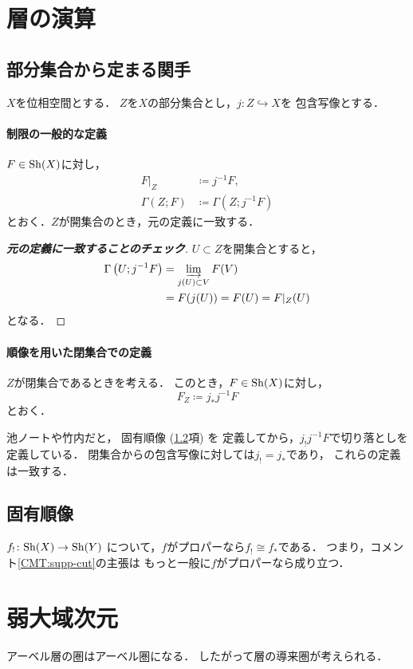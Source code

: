 \section{層の演算}
\subsection{部分集合から定まる関手}
\(X\)を位相空間とする．
\(Z\)を\(X\)の部分集合とし，\(j\colon Z\hookrightarrow X\)を
包含写像とする．
\paragraph{制限の一般的な定義}
\(F\in\Sh(X)\)に対し，
\begin{align}
    F\rvert_Z&\coloneqq j^{-1}F,\\
    \Gamma(Z;F)&\coloneqq\Gamma\left(Z;j^{-1}F\right)    
\end{align}
とおく．\(Z\)が開集合のとき，元の定義に一致する．
\begin{proof}[\textbf{元の定義に一致することのチェック}]
    \(U\subset Z\)を開集合とすると，
    \begin{align*}
        \Gamma\left(U;j^{-1}F\right)
        &=\indlim[j(U)\subset V]F(V)\\
        &=F(j(U))=F(U)=F\rvert_Z(U)
    \end{align*}
    となる．
\end{proof}
\paragraph{順像を用いた閉集合での定義}
\(Z\)が閉集合であるときを考える．
このとき，\(F\in\Sh(X)\)に対し，
\[
    F_Z\coloneqq j_{\ast}j^{-1}F
\]
とおく．
\begin{CMT}\label{CMT:supp-cut}
    池ノート\cite{Ike21}や竹内\cite{Tak17}だと，
    固有順像 (\ref{ssec:pdimg}項) を
    定義してから，\(j_{!}j^{-1}F\)で切り落としを定義している．
    閉集合からの包含写像に対しては\(j_!=j_\ast\)であり，
    これらの定義は一致する．
\end{CMT}

\subsection{固有順像}\label{ssec:pdimg}

\(f_!\colon\Sh(X)\to\Sh(Y)\)
について，\(f\)がプロパーなら\(f_!\cong f_\ast\)である．
つまり，コメント\ref*{CMT:supp-cut}の主張は
もっと一般に\(f\)がプロパーなら成り立つ．
\section{弱大域次元}
アーベル層の圏はアーベル圏になる．
したがって層の導来圏が考えられる．

